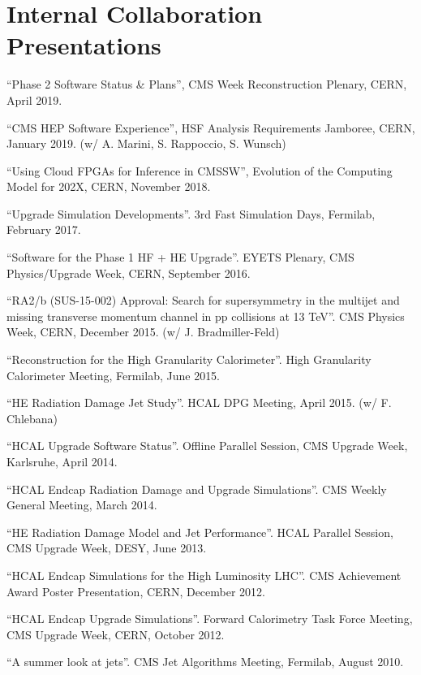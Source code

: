\ifdefined\longflag
\section{Internal Collaboration Presentations}
\begin{description}[leftmargin=12pt,font=\normalfont,labelsep=0em]
\item ``Phase 2 Software Status \& Plans'', CMS Week Reconstruction Plenary, CERN, April 2019.
\item ``CMS HEP Software Experience'', HSF Analysis Requirements Jamboree, CERN, January 2019. (w/ A. Marini, S. Rappoccio, S. Wunsch)
\item ``Using Cloud FPGAs for Inference in CMSSW'', Evolution of the Computing Model for 202X, CERN, November 2018.
\item ``Upgrade Simulation Developments''. 3rd Fast Simulation Days, Fermilab, February 2017.
\item ``Software for the Phase 1 HF + HE Upgrade''. EYETS Plenary, CMS Physics/Upgrade Week, CERN, September 2016.
\item ``RA2/b (SUS-15-002) Approval: Search for supersymmetry in the multijet and missing transverse momentum channel in pp collisions at 13 TeV''. CMS Physics Week, CERN, December 2015. (w/ J. Bradmiller-Feld)
\item ``Reconstruction for the High Granularity Calorimeter''. High Granularity Calorimeter Meeting, Fermilab, June 2015.
\item ``HE Radiation Damage Jet Study''. HCAL DPG Meeting, April 2015. (w/ F. Chlebana)
\item ``HCAL Upgrade Software Status''. Offline Parallel Session, CMS Upgrade Week, Karlsruhe, April 2014.
\item ``HCAL Endcap Radiation Damage and Upgrade Simulations''. CMS Weekly General Meeting, March 2014.
\item ``HE Radiation Damage Model and Jet Performance''. HCAL Parallel Session, CMS Upgrade Week, DESY, June 2013.
\item ``HCAL Endcap Simulations for the High Luminosity LHC''. CMS Achievement Award Poster Presentation, CERN, December 2012.
\item ``HCAL Endcap Upgrade Simulations''. Forward Calorimetry Task Force Meeting, CMS Upgrade Week, CERN, October 2012.
\item ``A summer look at jets''. CMS Jet Algorithms Meeting, Fermilab, August 2010.
\end{description}
\fi